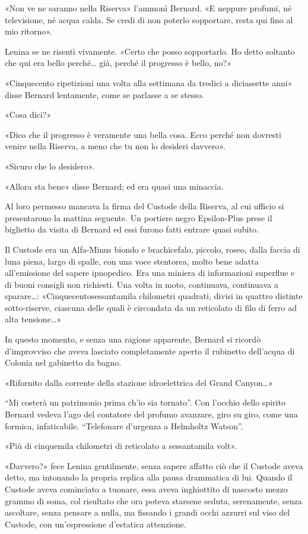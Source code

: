 \documentclass[
a5paper, %
10pt, %
twoside, 
onecolumn, %
openany, %
]{memoir}
\begin{document}
«Non ve ne saranno nella Riserva» l’ammonì Bernard. «E neppure profumi, né televisione, né acqua calda. Se credi di non poterlo sopportare, resta qui fino al mio ritorno».

Lenina se ne risentì vivamente. «Certo che posso sopportarlo. Ho detto soltanto che qui era bello perché… già, perché il progresso è bello, no?»

«Cinquecento ripetizioni una volta alla settimana da tredici a diciassette anni» disse Bernard lentamente, come se parlasse a se stesso.

«Cosa dici?»

«Dico che il progresso è veramente una bella cosa. Ecco perché non dovresti venire nella Riserva, a meno che tu non lo desideri davvero».

«Sicuro che lo desidero».

«Allora sta bene» disse Bernard; ed era quasi una minaccia.

Al loro permesso mancava la firma del Custode della Riserva, al cui ufficio si presentarono la mattina seguente. Un portiere negro Epsilon-Plus prese il biglietto da visita di Bernard ed essi furono fatti entrare quasi subito.

Il Custode era un Alfa-Minus biondo e brachicefalo, piccolo, roseo, dalla faccia di luna piena, largo di spalle, con una voce stentorea, molto bene adatta all’emissione del sapere ipnopedico. Era una miniera di informazioni superflue e di buoni consigli non richiesti. Una volta in moto, continuava, continuava a sparare…: «Cinquecentosessantamila chilometri quadrati, divisi in quattro distinte sotto-riserve, ciascuna delle quali è circondata da un reticolato di filo di ferro ad alta tensione…»

In questo momento, e senza una ragione apparente, Bernard si ricordò d’improvviso che aveva lasciato completamente aperto il rubinetto dell’acqua di Colonia nel gabinetto da bagno.

«Rifornito dalla corrente della stazione idroelettrica del Grand Canyon…»

“Mi costerà un patrimonio prima ch’io sia tornato”. Con l’occhio dello spirito Bernard vedeva l’ago del contatore del profumo avanzare, giro su giro, come una formica, infaticabile. “Telefonare d’urgenza a Helmholtz Watson”.

«Più di cinquemila chilometri di reticolato a sessantamila volt».

«Davvero?» fece Lenina gentilmente, senza sapere affatto ciò che il Custode aveva detto, ma intonando la propria replica alla pausa drammatica di lui. Quando il Custode aveva cominciato a tuonare, essa aveva inghiottito di nascosto mezzo grammo di soma, col risultato che ora poteva starsene seduta, serenamente, senza ascoltare, senza pensare a nulla, ma fissando i grandi occhi azzurri sul viso del Custode, con un’espressione d’estatica attenzione.
\end{document}
